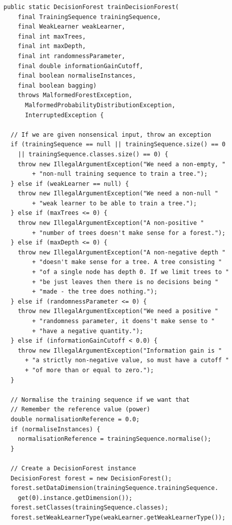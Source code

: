 \documentclass[12pt,twoside,notitlepage]{report}
\begin{document}
    \begin{lstlisting}[float=tp,caption={The implementation code for training a decision forest.}, label={lst:actualTrainForest}]
public static DecisionForest trainDecisionForest(
    final TrainingSequence trainingSequence, 
    final WeakLearner weakLearner, 
    final int maxTrees, 
    final int maxDepth, 
    final int randomnessParameter,
    final double informationGainCutoff, 
    final boolean normaliseInstances, 
    final boolean bagging) 
    throws MalformedForestException, 
      MalformedProbabilityDistributionException, 
      InterruptedException {
  
  // If we are given nonsensical input, throw an exception
  if (trainingSequence == null || trainingSequence.size() == 0 
    || trainingSequence.classes.size() == 0) {
    throw new IllegalArgumentException("We need a non-empty, "
        + "non-null training sequence to train a tree.");
  } else if (weakLearner == null) {
    throw new IllegalArgumentException("We need a non-null "
        + "weak learner to be able to train a tree.");
  } else if (maxTrees <= 0) {
    throw new IllegalArgumentException("A non-positive "
        + "number of trees doesn't make sense for a forest.");
  } else if (maxDepth <= 0) {
    throw new IllegalArgumentException("A non-negative depth "
        + "doesn't make sense for a tree. A tree consisting "
        + "of a single node has depth 0. If we limit trees to "
        + "be just leaves then there is no decisions being " 
        + "made - the tree does nothing.");
  } else if (randomnessParameter <= 0) {
    throw new IllegalArgumentException("We need a positive "
        + "randomness parameter, it doens't make sense to " 
        + "have a negative quantity.");
  } else if (informationGainCutoff < 0.0) {
    throw new IllegalArgumentException("Information gain is "
      + "a strictly non-negative value, so must have a cutoff "
      + "of more than or equal to zero.");
  }
  
  // Normalise the training sequence if we want that
  // Remember the reference value (power)
  double normalisationReference = 0.0;
  if (normaliseInstances) {
    normalisationReference = trainingSequence.normalise();
  }
  
  // Create a DecisionForest instance
  DecisionForest forest = new DecisionForest();
  forest.setDataDimension(trainingSequence.trainingSequence.
    get(0).instance.getDimension());
  forest.setClasses(trainingSequence.classes);
  forest.setWeakLearnerType(weakLearner.getWeakLearnerType());


\end{lstlisting}
\end{document}
